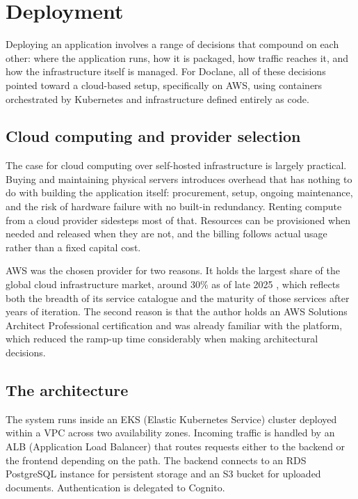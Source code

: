 \chapter{Deployment}
\label{chap:ch4}

\par Deploying an application involves a range of decisions that compound on each other: where the application runs, how it is packaged, how traffic reaches it, and how the infrastructure itself is managed. For Doclane, all of these decisions pointed toward a cloud-based setup, specifically on AWS, using containers orchestrated by Kubernetes and infrastructure defined entirely as code.

\section{Cloud computing and provider selection}

\par The case for cloud computing over self-hosted infrastructure is largely practical. Buying and maintaining physical servers introduces overhead that has nothing to do with building the application itself: procurement, setup, ongoing maintenance, and the risk of hardware failure with no built-in redundancy. Renting compute from a cloud provider sidesteps most of that. Resources can be provisioned when needed and released when they are not, and the billing follows actual usage rather than a fixed capital cost.

\par AWS was the chosen provider for two reasons. It holds the largest share of the global cloud infrastructure market, around 30\% as of late 2025 \cite{synergy2025cloud}, which reflects both the breadth of its service catalogue and the maturity of those services after years of iteration. The second reason is that the author holds an AWS Solutions Architect Professional certification and was already familiar with the platform, which reduced the ramp-up time considerably when making architectural decisions.

\section{The architecture}

\par The system runs inside an EKS (Elastic Kubernetes Service) cluster deployed within a VPC across two availability zones. Incoming traffic is handled by an ALB (Application Load Balancer) that routes requests either to the backend or the frontend depending on the path. The backend connects to an RDS PostgreSQL instance for persistent storage and an S3 bucket for uploaded documents. Authentication is delegated to Cognito.

